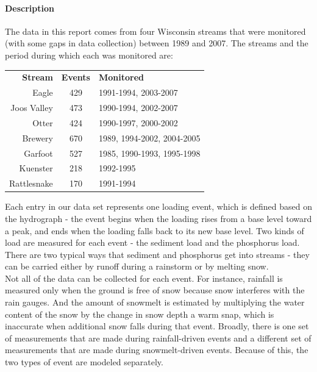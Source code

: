 \documentclass[12pt]{article}
\begin{document}
\paragraph{Description}
The data in this report comes from four Wisconsin streams that were monitored (with some gaps in data collection) between 1989 and 2007. The streams and the period during which each was monitored are:

\begin{table}[h]
\begin{center}
\begin{tabular}{r c l}
        \textbf{Stream}  & \textbf{Events} & \textbf{Monitored}\\
        Eagle & 429 &1991-1994, 2003-2007\\
        Joos Valley & 473 & 1990-1994, 2002-2007\\
        Otter & 424 & 1990-1997, 2000-2002\\
        Brewery & 670 & 1989, 1994-2002, 2004-2005\\
        Garfoot & 527 & 1985, 1990-1993, 1995-1998\\
        Kuenster & 218 & 1992-1995\\
        Rattlesnake & 170 & 1991-1994\\
    \end{tabular}
\end{center}
\end{table}

Each entry in our data set represents one loading event, which is defined based on the hydrograph - the event begins when the loading rises from a base level toward a peak, and ends when the loading falls back to its new base level. Two kinds of load are measured for each event - the sediment load and the phosphorus load. There are two typical ways that sediment and phosphorus get into streams - they can be carried either by runoff during a rainstorm or by melting snow.\\

Not all of the data can be collected for each event. For instance, rainfall is measured only when the ground is free of snow because snow interferes with the rain gauges. And the amount of snowmelt is estimated by multiplying the water content of the snow by the change in snow depth a warm snap, which is inaccurate when additional snow falls during that event. Broadly, there is one set of measurements that are made during rainfall-driven events and a different set of measurements that are made during snowmelt-driven events. Because of this, the two types of event are modeled separately.\\
\end{document}
